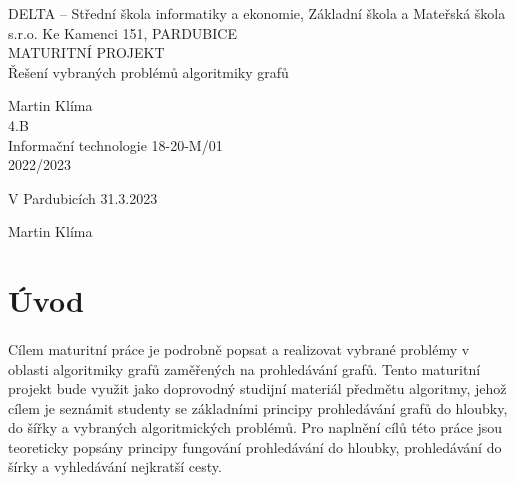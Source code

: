 \documentclass[12pt, titlepage, a4paper]{article}
\begin{document}
    \begin{titlepage}
        \bfseries{
            \begin{center}
                \Large{DELTA – Střední škola informatiky a ekonomie, Základní škola a Mateřská škola
                s.r.o.
                \newline
                Ke Kamenci 151, PARDUBICE}
                \vspace{0.4 \textheight}\\
                \large{
                    MATURITNÍ PROJEKT
                }\\
                \vspace{14pt}
                \LARGE{
                    Řešení vybraných problémů algoritmiky grafů
                }
                \vspace{0.3 \textheight}
            \end{center}
        \noindent\large{Martin Klíma}\\
        \noindent\large{4.B}\\
        \noindent\large{Informační technologie 18-20-M/01}\\
        \noindent\large{2022/2023}\\
        }
  \end{titlepage}
\clearpage


\clearpage
\vspace*{0.8\textheight}


\vspace{20pt}

\noindent V Pardubicích 31.3.2023 \hspace{150pt}\dotfill{}

\hspace{9.5cm} Martin Klíma
\clearpage
\tableofcontents
\newpage

\section{Úvod}
\paragraph{}
Cílem maturitní práce je podrobně popsat a realizovat vybrané problémy v oblasti 
algoritmiky grafů zaměřených na prohledávání grafů.
Tento maturitní projekt bude využit jako doprovodný studijní materiál předmětu 
algoritmy, jehož cílem je seznámit studenty se základními principy 
prohledávání grafů do hloubky, do šířky a vybraných algoritmických problémů. 
Pro naplnění cílů této práce jsou teoreticky popsány principy fungování prohledávání do hloubky,
prohledávání do šírky a vyhledávání nejkratší cesty.
\end{document}
